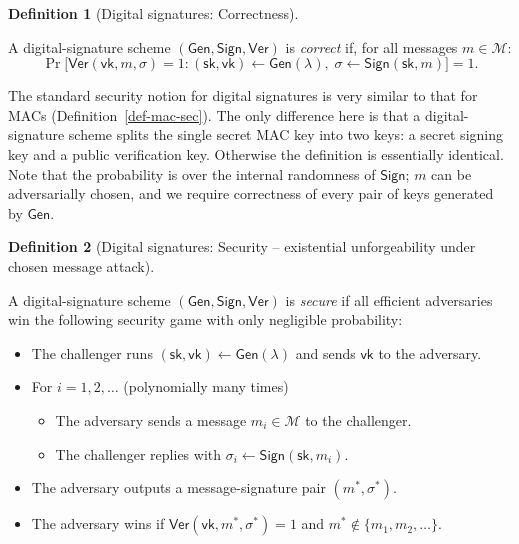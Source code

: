 \documentclass[
  letterpaper,
]{scrbook}
\providecommand{\tightlist}{%
  \setlength{\itemsep}{0pt}\setlength{\parskip}{0pt}}
\newcommand{\calM}{\mathcal{M}}
\newcommand{\Gen}{\mathsf{Gen}}
\newcommand{\Sign}{\mathsf{Sign}}
\newcommand{\Ver}{\mathsf{Ver}}
\newcommand{\sk}{\mathsf{sk}}
\newcommand{\vk}{\mathsf{vk}}
\theoremstyle{definition}
\newtheorem{definition}{Definition}[chapter]
\theoremstyle{plain}
\theoremstyle{plain}
\theoremstyle{remark}
\begin{document}
\begin{definition}[Digital signatures:
Correctness]\protect\hypertarget{def-sig-correctness}{}\label{def-sig-correctness}

A digital-signature scheme \((\Gen, \Sign, \Ver)\) is \emph{correct} if,
for all messages \(m \in \calM\):
\[ \Pr\big[\Ver(\vk, m, \sigma) = 1 \colon (\sk, \vk) \gets \Gen(\lambda),\;
   \sigma \gets \Sign(\sk, m) \big] = 1. \]

\end{definition}

The standard security notion for digital signatures is very similar to
that for MACs (Definition~\ref{def-mac-sec}). The only difference here
is that a digital-signature scheme splits the single secret MAC key into
two keys: a secret signing key and a public verification key. Otherwise
the definition is essentially identical. Note that the probability is
over the internal randomness of \(\Sign\); \(m\) can be adversarially
chosen, and we require correctness of every pair of keys generated by
\(\Gen\).

\begin{definition}[Digital signatures: Security -- existential
unforgeability under chosen message
attack]\protect\hypertarget{def-sig-sec}{}\label{def-sig-sec}

A digital-signature scheme \((\Gen, \Sign, \Ver)\) is \emph{secure} if
all efficient adversaries win the following security game with only
negligible probability:

\begin{itemize}
\tightlist
\item
  The challenger runs \((\sk, \vk) \gets \Gen(\lambda)\) and sends
  \(\vk\) to the adversary.
\item
  For \(i = 1, 2, \dots\) (polynomially many times)

  \begin{itemize}
  \tightlist
  \item
    The adversary sends a message \(m_i \in \calM\) to the challenger.
  \item
    The challenger replies with \(\sigma_i \gets \Sign(\sk, m_i)\).
  \end{itemize}
\item
  The adversary outputs a message-signature pair \((m^*, \sigma^*)\).
\item
  The adversary wins if \(\Ver(\vk, m^*, \sigma^*) = 1\) and
  \(m^* \not \in \{m_1, m_2, \dots\}\).
\end{itemize}

\end{definition}
\end{document}
